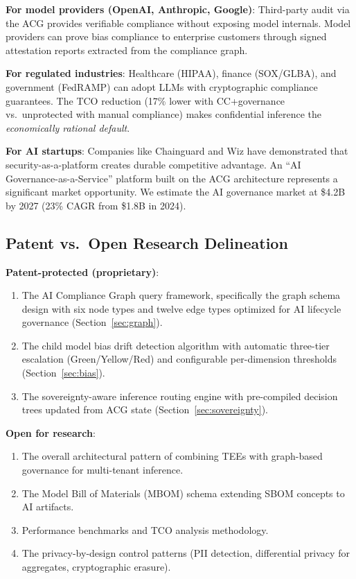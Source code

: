 \documentclass[conference,10pt]{IEEEtran}
\begin{document}
\textbf{For model providers (OpenAI, Anthropic, Google)}: Third-party audit via the ACG provides verifiable compliance without exposing model internals. Model providers can prove bias compliance to enterprise customers through signed attestation reports extracted from the compliance graph.

\textbf{For regulated industries}: Healthcare (HIPAA), finance (SOX/GLBA), and government (FedRAMP) can adopt LLMs with cryptographic compliance guarantees. The TCO reduction (17\% lower with CC+governance vs.\ unprotected with manual compliance) makes confidential inference the \emph{economically rational default}.

\textbf{For AI startups}: Companies like Chainguard and Wiz have demonstrated that security-as-a-platform creates durable competitive advantage. An ``AI Governance-as-a-Service'' platform built on the ACG architecture represents a significant market opportunity. We estimate the AI governance market at \$4.2B by 2027 (23\% CAGR from \$1.8B in 2024).

\subsection{Patent vs.\ Open Research Delineation}

\textbf{Patent-protected (proprietary)}:
\begin{enumerate}
\item The AI Compliance Graph query framework, specifically the graph schema design with six node types and twelve edge types optimized for AI lifecycle governance (Section~\ref{sec:graph}).
\item The child model bias drift detection algorithm with automatic three-tier escalation (Green/Yellow/Red) and configurable per-dimension thresholds (Section~\ref{sec:bias}).
\item The sovereignty-aware inference routing engine with pre-compiled decision trees updated from ACG state (Section~\ref{sec:sovereignty}).
\end{enumerate}

\textbf{Open for research}:
\begin{enumerate}
\item The overall architectural pattern of combining TEEs with graph-based governance for multi-tenant inference.
\item The Model Bill of Materials (MBOM) schema extending SBOM concepts to AI artifacts.
\item Performance benchmarks and TCO analysis methodology.
\item The privacy-by-design control patterns (PII detection, differential privacy for aggregates, cryptographic erasure).
\end{enumerate}
\end{document}
